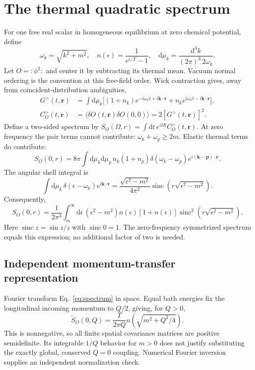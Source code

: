 \documentclass[11pt]{article}
\newcommand{\sinc}{\operatorname{sinc}}
\newcommand{\dd}{\mathrm{d}}
\begin{document}
\section{The thermal quadratic spectrum}
For one free real scalar in homogeneous equilibrium at zero chemical
potential, define
\begin{equation}
 \omega_k=\sqrt{k^2+m^2},\quad n(\epsilon)=\frac1{e^{\epsilon/T}-1},\quad
 \dd\mu_k=\frac{\dd^3k}{(2\pi)^3\,2\omega_k}.
\end{equation}
Let $O=:\!\phi^2\!:$ and center it by subtracting its thermal mean.
Vacuum normal ordering is the convention at this free-field order.
Wick contraction gives, away from coincident-distribution ambiguities,
\begin{align}
 G^>(t,\mathbf r)&=\int\dd\mu_k\big[(1+n_k)e^{-i\omega_kt+i\mathbf k\cdot\mathbf r}
                         +n_ke^{i\omega_kt-i\mathbf k\cdot\mathbf r}\big],\\
 C_O^>(t,\mathbf r)&=\langle\delta O(t,\mathbf r)\delta O(0,0)\rangle
                   =2[G^>(t,\mathbf r)]^2.\label{eq:wick}
\end{align}
Define a two-sided spectrum by $S_O(\Omega,r)=\int\dd t\,
e^{i\Omega t}C_O^>(t,\mathbf r)$. At zero frequency the pair terms cannot
contribute: $\omega_k+\omega_p\geq2m$. Elastic thermal terms do contribute:
\begin{equation}
 S_O(0,r)=8\pi\int\dd\mu_k\dd\mu_p\,n_k(1+n_p)
 \delta(\omega_k-\omega_p)e^{i(\mathbf k-\mathbf p)\cdot\mathbf r}.
\end{equation}
The angular shell integral is
\begin{equation}
 \int\dd\mu_k\,\delta(\epsilon-\omega_k)e^{i\mathbf k\cdot\mathbf r}
 =\frac{\sqrt{\epsilon^2-m^2}}{4\pi^2}
   \sinc\!\left(r\sqrt{\epsilon^2-m^2}\right).
\end{equation}
Consequently,
\begin{equation}
 \boxed{S_O(0,r)=\frac1{2\pi^3}\int_m^\infty\dd\epsilon\,
 (\epsilon^2-m^2)n(\epsilon)[1+n(\epsilon)]
 \sinc^2\!\left(r\sqrt{\epsilon^2-m^2}\right).}\label{eq:spectrum}
\end{equation}
Here $\sinc z=\sin z/z$ with $\sinc0=1$.
The zero-frequency symmetrized spectrum equals this expression; no
additional factor of two is needed.

\subsection*{Independent momentum-transfer representation}
Fourier transform Eq.~\eqref{eq:spectrum} in space. Equal bath energies
fix the longitudinal incoming momentum to $Q/2$, giving, for $Q>0$,
\begin{equation}
 \widetilde S_O(0,Q)=\frac{T}{2\pi Q}
 n\!\left(\sqrt{m^2+Q^2/4}\right).\label{eq:qspec}
\end{equation}
This is nonnegative, so all finite spatial covariance matrices are
positive semidefinite. Its integrable $1/Q$ behavior for $m>0$ does not
justify substituting the exactly global, conserved $Q=0$ coupling.
Numerical Fourier inversion supplies an independent normalization check.
\end{document}
